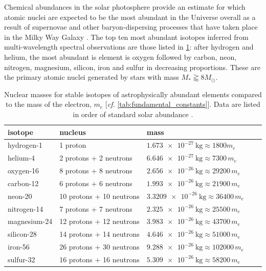 \label{ap:quantum_spectral}
Chemical abundances in the solar photosphere provide an estimate for which atomic nuclei are expected to be the most abundant in the Universe overall as a result of supernovae and other baryon-dispersing processes that have taken place in the Milky Way Galaxy \cite{Rolfs88,Carroll07}. 
The top ten most abundant isotopes inferred from multi-wavelength spectral observations \cite{Grevesse98,Asplund09} are those listed in \cref{tab:astro_element_nuclei_mass}: after hydrogen and helium, the most abundant is element is oxygen followed by carbon, neon, nitrogen, magnesium, silicon, iron and sulfur in decreasing proportions. 
These are the primary atomic nuclei generated by stars with mass $M_{*} \gtrapprox 8 M_{\odot}$. 
\begin{table}[]
 \centering
 \caption[Nuclear masses for stable isotopes of astrophysically abundant elements]{Nuclear masses for stable isotopes of astrophysically abundant elements compared to the mass of the electron, $m_e$ [\emph{cf.\@} \cref{tab:fundamental_constants}]. Data are listed in order of standard solar abundance \cite{Grevesse98,Asplund09}.}\label{tab:astro_element_nuclei_mass}
 \begin{tabular}{@{}lllll@{}} 
 \toprule
 isotope & nucleus & mass \\ \midrule
 hydrogen-1 & 1 proton & $\SI{1.673e-27}{\kilogram} \approx \num{1800} m_e$ \\
 helium-4 & 2 protons + 2 neutrons & $\SI{6.646e-27}{\kilogram} \approx \num{7300} \, m_e$ \\
 \midrule
 oxygen-16 & 8 protons + 8 neutrons & $\SI{2.656e-26}{\kilogram} \approx \num{29200} \, m_e$ \\
 carbon-12 & 6 protons + 6 neutrons &  $\SI{1.993e-26}{\kilogram} \approx \num{21900} \, m_e$ \\
 neon-20 & 10 protons + 10 neutrons & $\SI{3.3209e-26}{\kilogram} \approx \num{36400} \, m_e$ \\
 nitrogen-14 & 7 protons + 7 neutrons & $\SI{2.325e-26}{\kilogram} \approx \num{25500} \, m_e$ \\
 magnesium-24 & 12 protons + 12 neutrons & $\SI{3.983e-26}{\kilogram} \approx \num{43700} \, m_e$ \\
 silicon-28 & 14 protons + 14 neutrons & $\SI{4.646e-26}{\kilogram} \approx \num{51000} \, m_e$ \\
 iron-56 & 26 protons + 30 neutrons & $\SI{9.288e-26}{\kilogram} \approx \num{102000} \, m_e$ & \\
 sulfur-32 & 16 protons + 16 neutrons & $\SI{5.309e-26}{\kilogram} \approx \num{58200} \, m_e$ & \\
 \bottomrule
 \end{tabular}
 \end{table}  
